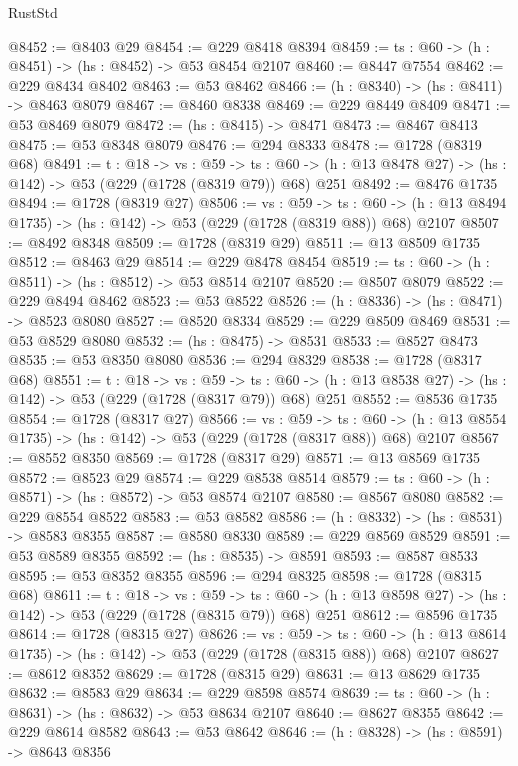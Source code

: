 \begin{lexlean}{RustStd}
\begin{coremodule}
@8452 := @8403 @29
@8454 := @229 @8418 @8394
@8459 := {ts : @60} -> (h : @8451) -> (hs : @8452) -> @53 @8454 @2107
@8460 := @8447 @7554
@8462 := @229 @8434 @8402
@8463 := @53 @8462
@8466 := (h : @8340) -> (hs : @8411) -> @8463 @8079
@8467 := @8460 @8338
@8469 := @229 @8449 @8409
@8471 := @53 @8469 @8079
@8472 := (hs : @8415) -> @8471
@8473 := @8467 @8413
@8475 := @53 @8348 @8079
@8476 := @294 @8333
@8478 := @1728 (@8319 @68)
@8491 := {t : @18} ->
  {vs : @59} ->
  {ts : @60} -> (h : @13 @8478 @27) -> (hs : @142) -> @53 (@229 (@1728 (@8319 @79)) @68) @251
@8492 := @8476 @1735
@8494 := @1728 (@8319 @27)
@8506 := {vs : @59} ->
  {ts : @60} -> (h : @13 @8494 @1735) -> (hs : @142) -> @53 (@229 (@1728 (@8319 @88)) @68) @2107
@8507 := @8492 @8348
@8509 := @1728 (@8319 @29)
@8511 := @13 @8509 @1735
@8512 := @8463 @29
@8514 := @229 @8478 @8454
@8519 := {ts : @60} -> (h : @8511) -> (hs : @8512) -> @53 @8514 @2107
@8520 := @8507 @8079
@8522 := @229 @8494 @8462
@8523 := @53 @8522
@8526 := (h : @8336) -> (hs : @8471) -> @8523 @8080
@8527 := @8520 @8334
@8529 := @229 @8509 @8469
@8531 := @53 @8529 @8080
@8532 := (hs : @8475) -> @8531
@8533 := @8527 @8473
@8535 := @53 @8350 @8080
@8536 := @294 @8329
@8538 := @1728 (@8317 @68)
@8551 := {t : @18} ->
  {vs : @59} ->
  {ts : @60} -> (h : @13 @8538 @27) -> (hs : @142) -> @53 (@229 (@1728 (@8317 @79)) @68) @251
@8552 := @8536 @1735
@8554 := @1728 (@8317 @27)
@8566 := {vs : @59} ->
  {ts : @60} -> (h : @13 @8554 @1735) -> (hs : @142) -> @53 (@229 (@1728 (@8317 @88)) @68) @2107
@8567 := @8552 @8350
@8569 := @1728 (@8317 @29)
@8571 := @13 @8569 @1735
@8572 := @8523 @29
@8574 := @229 @8538 @8514
@8579 := {ts : @60} -> (h : @8571) -> (hs : @8572) -> @53 @8574 @2107
@8580 := @8567 @8080
@8582 := @229 @8554 @8522
@8583 := @53 @8582
@8586 := (h : @8332) -> (hs : @8531) -> @8583 @8355
@8587 := @8580 @8330
@8589 := @229 @8569 @8529
@8591 := @53 @8589 @8355
@8592 := (hs : @8535) -> @8591
@8593 := @8587 @8533
@8595 := @53 @8352 @8355
@8596 := @294 @8325
@8598 := @1728 (@8315 @68)
@8611 := {t : @18} ->
  {vs : @59} ->
  {ts : @60} -> (h : @13 @8598 @27) -> (hs : @142) -> @53 (@229 (@1728 (@8315 @79)) @68) @251
@8612 := @8596 @1735
@8614 := @1728 (@8315 @27)
@8626 := {vs : @59} ->
  {ts : @60} -> (h : @13 @8614 @1735) -> (hs : @142) -> @53 (@229 (@1728 (@8315 @88)) @68) @2107
@8627 := @8612 @8352
@8629 := @1728 (@8315 @29)
@8631 := @13 @8629 @1735
@8632 := @8583 @29
@8634 := @229 @8598 @8574
@8639 := {ts : @60} -> (h : @8631) -> (hs : @8632) -> @53 @8634 @2107
@8640 := @8627 @8355
@8642 := @229 @8614 @8582
@8643 := @53 @8642
@8646 := (h : @8328) -> (hs : @8591) -> @8643 @8356

\end{coremodule}
\end{lexlean}
